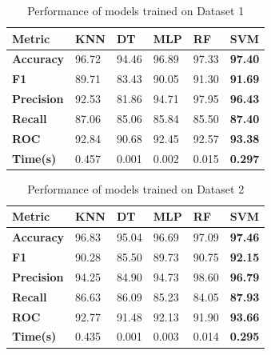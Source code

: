\begin{table}[H]
  \centering
  \caption{Performance of models trained on Dataset 1}\label{tab:performance_of_models_trained_on_dataset_1}
  \begin{tabular}{|p{5em}|C{3em}|C{3em}|C{3em}|C{3em}|C{3em}|}
    \hline
    \textbf{Metric}    & \textbf{KNN} & \textbf{DT} & \textbf{MLP} & \textbf{RF} & \textbf{SVM}   \\
    \hline
    \textbf{Accuracy}  & 96.72        & 94.46       & 96.89        & 97.33       & \textbf{97.40} \\
    \textbf{F1}        & 89.71        & 83.43       & 90.05        & 91.30       & \textbf{91.69} \\
    \textbf{Precision} & 92.53        & 81.86       & 94.71        & 97.95       & \textbf{96.43} \\
    \textbf{Recall}    & 87.06        & 85.06       & 85.84        & 85.50       & \textbf{87.40} \\
    \textbf{ROC}       & 92.84        & 90.68       & 92.45        & 92.57       & \textbf{93.38} \\
    \textbf{Time(s)}   & 0.457        & 0.001       & 0.002        & 0.015       & \textbf{0.297} \\
    \hline
  \end{tabular}
\end{table}

\begin{table}[H]
  \centering
  \caption{Performance of models trained on Dataset 2}\label{tab:performance_of_models_trained_on_dataset_2}
  \begin{tabular}{|p{5em}|C{3em}|C{3em}|C{3em}|C{3em}|C{3em}|}
    \hline
    \textbf{Metric}    & \textbf{KNN} & \textbf{DT} & \textbf{MLP} & \textbf{RF} & \textbf{SVM}   \\
    \hline
    \textbf{Accuracy}  & 96.83        & 95.04       & 96.69        & 97.09       & \textbf{97.46} \\
    \textbf{F1}        & 90.28        & 85.50       & 89.73        & 90.75       & \textbf{92.15} \\
    \textbf{Precision} & 94.25        & 84.90       & 94.73        & 98.60       & \textbf{96.79} \\
    \textbf{Recall}    & 86.63        & 86.09       & 85.23        & 84.05       & \textbf{87.93} \\
    \textbf{ROC}       & 92.77        & 91.48       & 92.13        & 91.90       & \textbf{93.66} \\
    \textbf{Time(s)}   & 0.435        & 0.001       & 0.003        & 0.014       & \textbf{0.295} \\
    \hline
  \end{tabular}
\end{table}

